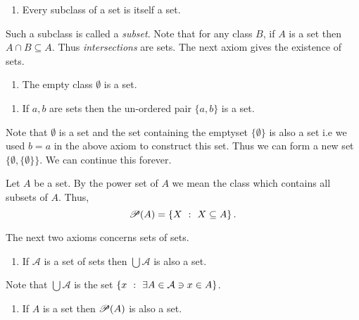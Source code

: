 \begin{enumerate}[label=\bfseries Axiom 3:]
    \item Every subclass of a set is itself a set.  
\end{enumerate}
Such a subclass is called a \textit{subset}. Note that for any class $B$, if $A$ is a set then
$A\cap B \subseteq A$. Thus \textit{intersections} are sets. 
The next axiom gives the existence of sets.

\begin{enumerate}[label=\bfseries Axiom 4:]
    \item The empty class $\emptyset$ is a set.
\end{enumerate}

\begin{enumerate}[label=\bfseries Axiom 5:]
    \item If $a,b$ are sets then the un-ordered pair $\lbrace a , b \rbrace$ is a set. 
\end{enumerate}

Note that $\emptyset$ is a set and the set containing the emptyset $\lbrace{\emptyset}\rbrace$ is
also a set i.e we used $b = a$ in the above axiom to construct this set. 
Thus we can form a new set $\lbrace \emptyset,\lbrace \emptyset \rbrace \rbrace$. We can
continue this forever.

\begin{Definition}
    Let $A$ be a set. By the power set of $A$ we mean the class which contains all subsets of $A$.
    Thus,
    \begin{equation*}
	\mathscr{P}{\left({A}\right)} = \left\lbrace{X\hspace{0.05in}}:{\hspace{0.05in}X \subseteq A} \right\rbrace.
    \end{equation*}
\end{Definition}

The next two axioms concerns sets of sets. 

\begin{enumerate}[label=\bfseries Axiom 6:]
    \item If $\mathcal{A}$ is a set of sets then $\bigcup \mathcal{A}$ is also a set.
\end{enumerate}
Note that $\bigcup{\mathcal{A}}$ is the set $\left\lbrace{x\hspace{0.05in}}:{\hspace{0.05in}\exists A \in \mathcal{A} \ni x \in A} \right\rbrace$.

\begin{enumerate}[label=\bfseries Axiom 7:]
    \item If $A$ is a set then $\mathscr{P}{\left({A}\right)}$ is also a set.
\end{enumerate}

